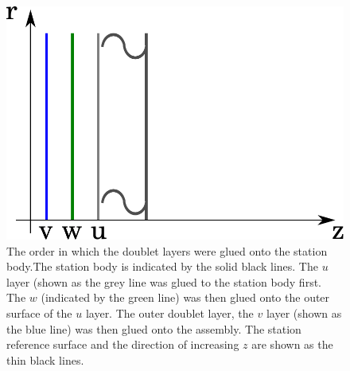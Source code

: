 
\begin{figure}
  \begin{center}
    \includegraphics[width=0.65\linewidth]{detectors/tracker/02-Definitions/Figures/doublet-layer-order.pdf}
  \end{center}
  \caption{ The order in which the doublet layers were glued onto the station body.The station body is indicated by the solid black lines. The $u$ layer (shown as the grey line was glued to the station body first. The $w$ (indicated by the green line) was then glued onto the outer surface of the $u$ layer.  The outer doublet layer, the $v$ layer (shown as the blue line) was then glued onto the assembly. The station reference surface and the direction of increasing $z$  are shown as the thin black lines.}
  \label{Fig:DblLyrOrder}
\end{figure}


